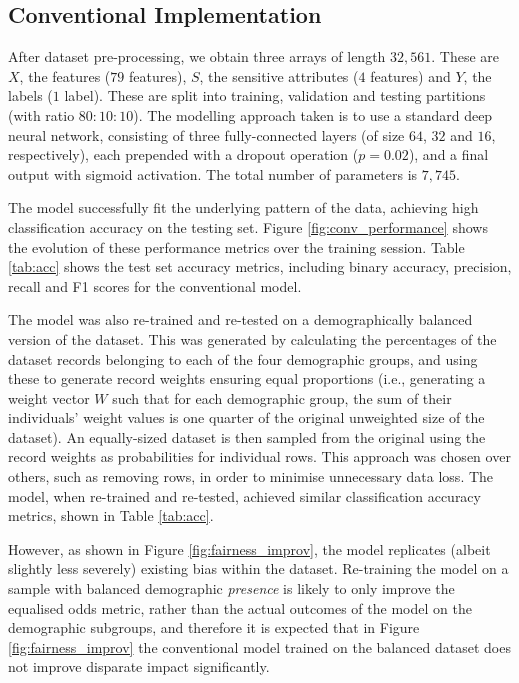 \documentclass[conference]{IEEEtran}
\begin{document}
\subsection{Conventional Implementation}
After dataset pre-processing, we obtain three arrays of length $32,561$. These are $X$, the features ($79$ features), $S$, the sensitive attributes ($4$ features) and $Y$, the labels ($1$ label). These are split into training, validation and testing partitions (with ratio $80:10:10$). The modelling approach taken is to use a standard deep neural network, consisting of three fully-connected layers (of size $64$, $32$ and $16$, respectively), each prepended with a dropout operation ($p=0.02$), and a final output with sigmoid activation. The total number of parameters is $7,745$. 

The model successfully fit the underlying pattern of the data, achieving high classification accuracy on the testing set. Figure \ref{fig:conv_performance} shows the evolution of these performance metrics over the training session. Table \ref{tab:acc} shows the test set accuracy metrics, including binary accuracy, precision, recall and F1 scores for the conventional model.

The model was also re-trained and re-tested on a demographically balanced version of the dataset. This was generated by calculating the percentages of the dataset records belonging to each of the four demographic groups, and using these to generate record weights ensuring equal proportions (i.e., generating a weight vector $W$ such that for each demographic group, the sum of their individuals' weight values is one quarter of the original unweighted size of the dataset). An equally-sized dataset is then sampled from the original using the record weights as probabilities for individual rows. This approach was chosen over others, such as removing rows, in order to minimise unnecessary data loss. The model, when re-trained and re-tested, achieved similar classification accuracy metrics, shown in Table \ref{tab:acc}.

However, as shown in Figure \ref{fig:fairness_improv}, the model replicates (albeit slightly less severely) existing bias within the dataset. Re-training the model on a sample with balanced demographic \emph{presence} is likely to only improve the equalised odds metric, rather than the actual outcomes of the model on the demographic subgroups, and therefore it is expected that in Figure \ref{fig:fairness_improv} the conventional model trained on the balanced dataset does not improve disparate impact significantly.
\end{document}
